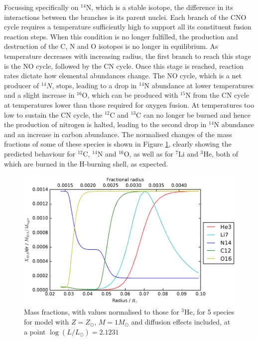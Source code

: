 \documentclass[12pt, a4paper]{report}
\begin{document}
Focussing specifically on $^{14}$N, which is a stable isotope, the difference in its interactions between the branches is its parent nuclei. Each branch of the CNO cycle requires a temperature sufficiently high to support all its constituent fusion reaction steps. When this condition is no longer fulfilled, the production and destruction of the C, N and O isotopes is no longer in equilibrium. As temperature decreases with increasing radius, the first branch to reach this stage is the NO cycle, followed by the CN cycle. Once this stage is reached, reaction rates dictate how elemental abundances change. The NO cycle, which is a net producer of $^{14}N$, stops, leading to a drop in $^{14}$N abundance at lower temperatures and a slight increase in $^{16}$O, which can be produced with $^{15}$N from the CN cycle at temperatures lower than those required for oxygen fusion. At temperatures too low to sustain the CN cycle, the $^{12}$C and $^{13}$C can no longer be burned and hence the production of nitrogen is halted, leading to the second drop in $^{14}$N abundance and an increase in carbon abundance. The normalised changes of the mass fractions of some of these species is shown in Figure \ref{5specs_norm}, clearly showing the predicted behaviour for $^{12}$C, $^{14}$N and $^{16}$O, as well as for $^{7}$Li and $^{3}$He, both of which are burned in the H-burning shell, as expected.

\begin{figure}
\begin{center}
\includegraphics[scale=0.8]{../mu_test_data/mu_test_graphs/burning_logL=2p1231_5species.png}
\caption{Mass fractions, with values normalised to those for $^{3}$He, for 5 species for model with $Z = Z_{\odot}$, $M = 1M_{\odot}$ and diffusion effects included, at a point $\log(L/L_{\odot}) = 2.1231$}
\label{5specs_norm}
\end{center}
\end{figure}
\end{document}
